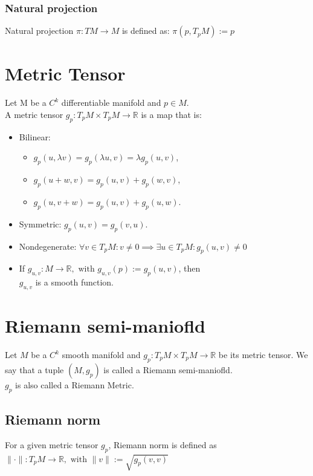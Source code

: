 \documentclass[a4paper, 11pt]{article}
\newcommand{\Real}{\mathbb{R}}
\theoremstyle{definition}
\begin{document}
\subsubsection{Natural projection}
Natural projection $\pi: TM \rightarrow M$ is defined as:
$\pi(p, T_pM) := p$

\section{Metric Tensor}
Let M be a $C^k$ differentiable manifold and $p \in M$. \\
A metric tensor $g_p: T_pM \times T_pM \rightarrow \Real$ is a map that is: \\
\begin{itemize}
  \item Bilinear: 
		\begin{itemize}
			\item $g_p(u, \lambda v) = g_p(\lambda u, v) = \lambda g_p(u, v)$,
			\item $g_p(u + w, v) = g_p(u, v) + g_p(w, v)$,
			\item $g_p(u, v + w) = g_p(u, v) + g_p(u, w)$.
		\end{itemize}
  \item Symmetric: $g_p(u, v) = g_p(v, u)$.
  \item Nondegenerate:	$\forall v \in T_pM: v \neq 0 \implies \exists u \in T_pM: g_p(u, v) \neq 0$
  \item If $g_{u, v}: M \rightarrow \Real, \text{ with } g_{u, v}(p) := g_p(u, v)$, then \\
$g_{u, v}$ is a smooth function.
\end{itemize}

\section{Riemann semi-maniofld}
Let $M$ be a $C^k$ smooth manifold and $g_p: T_pM \times T_pM \rightarrow \Real$ be its metric tensor. We say that a tuple $(M, g_p)$ is called a Riemann semi-maniofld. \\
$g_p$ is also called a Riemann Metric.

\subsection{Riemann norm}
For a given metric tensor $g_p$, Riemann norm is defined as $\|\cdot\|: T_pM \rightarrow \Real, \text{ with } \|v\| := \sqrt{g_p(v, v)}$
\end{document}
